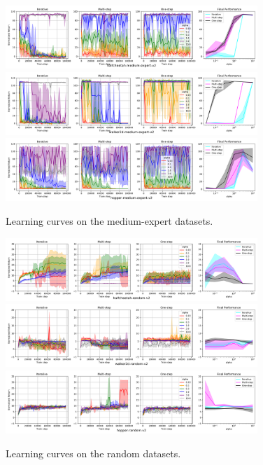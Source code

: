 \begin{figure}[h]
    \centering
    \includegraphics[width=0.85\textwidth]{figures/offline-rl/learning curves/lc-halfcheetah-medium-expert-v2.png}
    \includegraphics[width=0.85\textwidth]{figures/offline-rl/learning curves/lc-walker2d-medium-expert-v2.png}
    \includegraphics[width=0.85\textwidth]{figures/offline-rl/learning curves/lc-hopper-medium-expert-v2.png}
    \vspace{-0.2cm}
    \caption{Learning curves on the medium-expert datasets.}
    \label{fig:app_lc_medium-expert}
\end{figure}


\begin{figure}[h]
    \centering
    \includegraphics[width=0.85\textwidth]{figures/offline-rl/learning curves/lc-halfcheetah-random-v2.png}
    \includegraphics[width=0.85\textwidth]{figures/offline-rl/learning curves/lc-walker2d-random-v2.png}
    \includegraphics[width=0.85\textwidth]{figures/offline-rl/learning curves/lc-hopper-random-v2.png}
    \vspace{-0.2cm}
    \caption{Learning curves on the random datasets.}
    \label{fig:app_lc_random}
\end{figure}


\printendnotes
